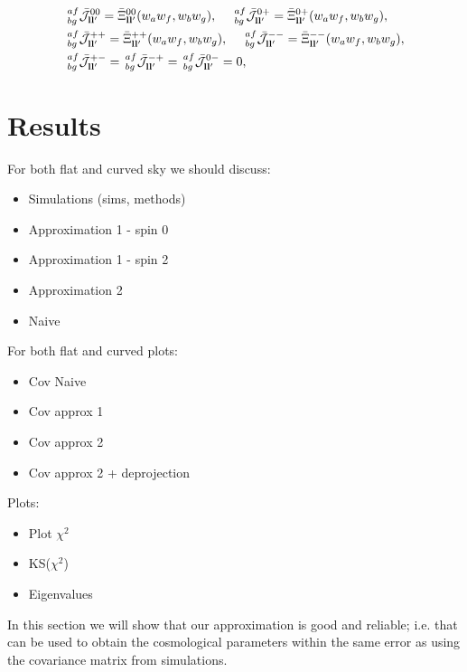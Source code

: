 \documentclass[a4paper,11pt]{article}
\begin{document}
      \begin{align}
        &\,^{af}_{bg}\bar{\mathcal{J}}^{00}_{{\bf l}{\bf l}'}=\bar{\Xi}^{00}_{{\bf l}{\bf l}'}(w_aw_f,w_bw_g),\hspace{12pt}
         \,^{af}_{bg}\bar{\mathcal{J}}^{0+}_{{\bf l}{\bf l}'}=\bar{\Xi}^{0+}_{{\bf l}{\bf l}'}(w_aw_f,w_bw_g),\\
        &\,^{af}_{bg}\bar{\mathcal{J}}^{++}_{{\bf l}{\bf l}'}=\bar{\Xi}^{++}_{{\bf l}{\bf l}'}(w_aw_f,w_bw_g),\hspace{12pt}
         \,^{af}_{bg}\bar{\mathcal{J}}^{--}_{{\bf l}{\bf l}'}=\bar{\Xi}^{--}_{{\bf l}{\bf l}'}(w_aw_f,w_bw_g),\\
        &\,^{af}_{bg}\bar{\mathcal{J}}^{+-}_{{\bf l}{\bf l}'}=
         \,^{af}_{bg}\bar{\mathcal{J}}^{-+}_{{\bf l}{\bf l}'}=
         \,^{af}_{bg}\bar{\mathcal{J}}^{0-}_{{\bf l}{\bf l}'}=0,
      \end{align}







\section{Results}
For both flat and curved sky we should discuss:
\begin{itemize}
\item Simulations (sims, methods)
\item Approximation 1 - spin 0
\item Approximation 1 - spin 2
\item Approximation 2
\item Naive
\end{itemize}

For both flat and curved plots:
\begin{itemize}
\item Cov Naive
\item Cov approx 1
\item Cov approx 2
\item Cov approx 2 + deprojection
\end{itemize}

Plots:
\begin{itemize}
\item Plot $\chi^2$
\item KS($\chi^2$)
\item Eigenvalues
\end{itemize}

In this section we will show that our approximation is good and reliable; i.e.
that can be used to obtain the cosmological parameters within the same error
as using the covariance matrix from simulations. 
\end{document}
